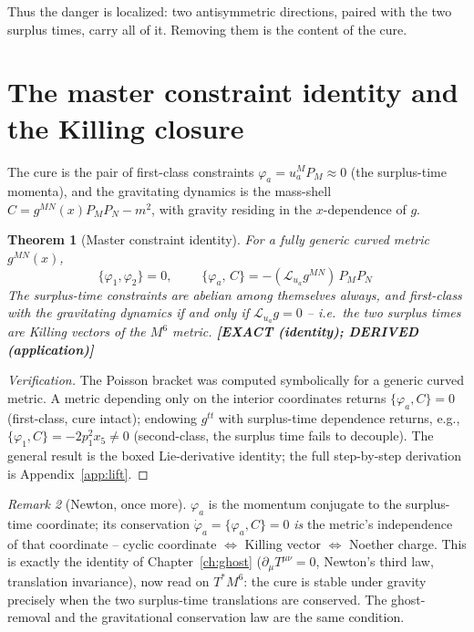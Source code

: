 \documentclass[11pt,oneside]{book}
\newcommand{\Lie}{\mathcal{L}}
\newcommand{\status}[1]{{\sffamily\bfseries\color{statuscol}[#1]}}
\theoremstyle{plain}
\newtheorem{theorem}{Theorem}[chapter]
\theoremstyle{definition}
\theoremstyle{remark}
\newtheorem{remark}[theorem]{Remark}
\begin{document}
Thus the danger is localized: two antisymmetric directions, paired with the two
surplus times, carry all of it. Removing them is the content of the cure.

\section{The master constraint identity and the Killing closure}
\label{sec:master-identity}

The cure is the pair of first-class constraints $\varphi_a=u_a^MP_M\approx0$ (the
surplus-time momenta), and the gravitating dynamics is the mass-shell
$C=g^{MN}(x)P_MP_N-m^2$, with gravity residing in the $x$-dependence of $g$.

\begin{theorem}[Master constraint identity]
\label{thm:master}
For a fully generic curved metric $g^{MN}(x)$,
\[
  \{\varphi_1,\varphi_2\}=0,
  \qquad
  \boxed{\;\{\varphi_a,\,C\}=-(\Lie_{u_a}g^{MN})\,P_MP_N\;}
\]
The surplus-time constraints are abelian among themselves \emph{always}, and
first-class with the gravitating dynamics \emph{if and only if}
$\Lie_{u_a}g=0$ -- i.e.\ the two surplus times are Killing vectors of the $M^6$
metric. \status{EXACT (identity); DERIVED (application)}
\end{theorem}

\begin{proof}[Verification]
The Poisson bracket was computed symbolically for a generic curved metric. A metric
depending only on the interior coordinates returns $\{\varphi_a,C\}=0$ (first-class,
cure intact); endowing $g^{tt}$ with surplus-time dependence returns, e.g.,
$\{\varphi_1,C\}=-2p_1^2x_5\neq0$ (second-class, the surplus time fails to
decouple). The general result is the boxed Lie-derivative identity; the full
step-by-step derivation is Appendix~\ref{app:lift}.
\end{proof}

\begin{remark}[Newton, once more]
\label{rem:newton-again}
$\varphi_a$ is the momentum conjugate to the surplus-time coordinate; its
conservation $\dot\varphi_a=\{\varphi_a,C\}=0$ \emph{is} the metric's independence
of that coordinate -- cyclic coordinate $\Leftrightarrow$ Killing vector
$\Leftrightarrow$ Noether charge. This is exactly the identity of
Chapter~\ref{ch:ghost} ($\partial_\mu T^{\mu\nu}=0$, Newton's third law,
translation invariance), now read on $T^*M^6$: the cure is stable under gravity
precisely when the two surplus-time translations are conserved. The ghost-removal
and the gravitational conservation law are the same condition.
\end{remark}
\end{document}
